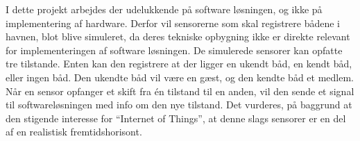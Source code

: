 I dette projekt arbejdes der udelukkende på software løsningen, og ikke på implementering af hardware. Derfor vil sensorerne som skal registrere bådene i havnen, blot blive simuleret, da deres tekniske opbygning ikke er direkte relevant for implementeringen af software løsningen. 
De simulerede sensorer kan opfatte tre tilstande. Enten kan den registrere at der ligger en ukendt båd, en kendt båd, eller ingen båd. Den ukendte båd vil være en gæst, og den kendte båd et medlem. Når en sensor opfanger et skift fra én tilstand til en anden, vil den sende et signal til softwareløsningen med info om den nye tilstand.
Det vurderes, på baggrund at den stigende interesse for \enquote{Internet of Things}, at denne slags sensorer er en del af en realistisk fremtidshorisont. 

